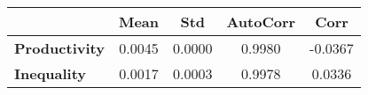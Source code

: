 \begin{tiny}\begin{tabular}{|l|c|c|c|c|}
\hline
&\textbf{Mean}&\textbf{Std}&\textbf{AutoCorr}&\textbf{Corr}\\\hline
\textbf{Productivity}&0.0045&0.0000&0.9980&-0.0367\\\hline
\textbf{Inequality}&0.0017&0.0003&0.9978&0.0336\\\hline
\end{tabular}
\end{tiny}
